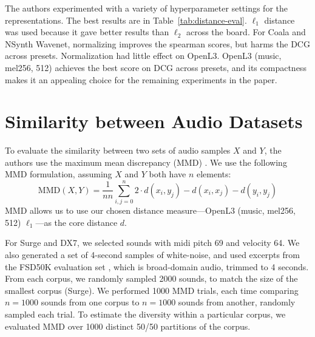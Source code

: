 The authors experimented with a variety of hyperparameter settings for the representations. The best results are in Table~\ref{tab:distance-eval}. $\ell_1$ distance was used because it gave better results than $\ell_2$ across the board. For Coala and NSynth Wavenet, normalizing
improves the spearman scores, but harms the DCG across presets. Normalization had little effect on OpenL3. %
OpenL3 (music, mel256, 512) achieves the best score on DCG across presets, and its compactness makes it an appealing choice for the remaining experiments in the paper.

\section{Similarity between Audio Datasets}
\label{sec:similarity-dataset}

To evaluate the similarity between two sets of audio samples $X$ and $Y$, the authors use the maximum mean discrepancy (MMD) \cite{JMLR:v13:gretton12a}. We use the following MMD formulation, assuming $X$ and $Y$ both have $n$ elements:
\begin{equation}
    \textrm{MMD}(X, Y) = \frac{1}{n n} \sum_{i,j=0}^n 2 \cdot d(x_i, y_j) - d(x_i, x_j) - d(y_i, y_j)
  \label{eq:mmd}
\end{equation}
MMD allows us to use our chosen distance measure---OpenL3 (music, mel256, 512) $\ell_1$---as the core distance $d$.

For Surge and DX7, we selected sounds with midi pitch 69 and velocity 64. We also generated a set of 4-second samples of white-noise, and used excerpts from the FSD50K evaluation set \cite{fonseca2020fsd50k}, which is broad-domain audio, trimmed to 4 seconds. From each corpus, we randomly sampled 2000 sounds, to match the size of the smallest corpus (Surge). We performed 1000 MMD trials, each time comparing $n=1000$ sounds from one corpus to $n=1000$ sounds from another,  randomly sampled each trial. To estimate the diversity within a particular corpus, we evaluated MMD over 1000 distinct 50/50 partitions of the corpus.

